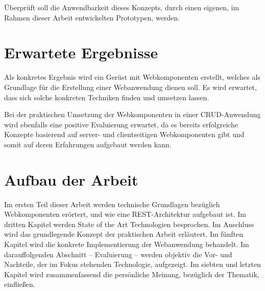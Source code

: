Überprüft soll die Anwendbarkeit dieses Konzepts, durch einen eigenen, im Rahmen dieser Arbeit entwickelten Prototypen, werden.

\section{Erwartete Ergebnisse}

Als konkretes Ergebnis wird ein Gerüst mit Webkomponenten erstellt, welches als Grundlage für die Erstellung einer Webanwendung dienen soll. Es wird erwartet, dass sich solche konkreten Techniken finden und umsetzen lassen.

Bei der praktischen Umsetzung der Webkomponenten in einer CRUD-Anwendung wird ebenfalls eine positive Evaluierung erwartet, da es bereits erfolgreiche Konzepte basierend auf server- und clientseitigen Webkomponenten gibt und somit auf deren Erfahrungen aufgebaut werden kann.

\section{Aufbau der Arbeit}
Im ersten Teil dieser Arbeit werden technische Grundlagen bezüglich Webkomponenten erörtert, und wie eine REST-Architektur aufgebaut ist. Im dritten Kapitel werden State of the Art Technologien besprochen. Im Anschluss wird das grundlegende Konzept der praktischen Arbeit erläutert. Im fünften Kapitel wird die konkrete Implementierung der Webanwendung behandelt. Im darauffolgenden Abschnitt -- Evaluierung -- werden objektiv die Vor- und Nachteile, der im Fokus stehenden Technologie, aufgezeigt. Im siebten und letzten Kapitel wird  zusammenfassend die persönliche Meinung, bezüglich der Thematik, einfließen. 